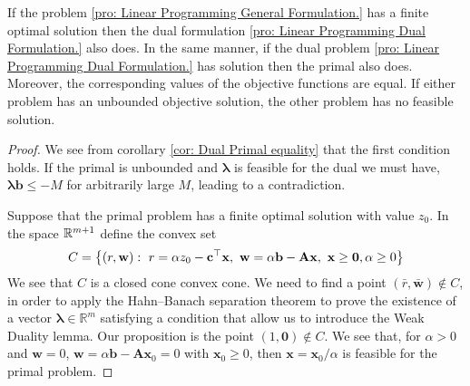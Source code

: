 \begin{theorem}
	If the problem \eqref{pro: Linear Programming General Formulation.} has a finite optimal solution then the dual formulation \eqref{pro: Linear Programming Dual Formulation.} also does. In the same manner, if the dual problem \eqref{pro: Linear Programming Dual Formulation.} has solution then the primal also does. Moreover, the corresponding values of the objective functions are equal. If either problem has an unbounded objective solution, the other problem has no feasible solution.
\end{theorem}
\begin{proof}
We see from corollary \ref{cor: Dual Primal equality} that the first condition holds. If the primal is unbounded and $\pmb{\lambda}$ is feasible for the dual we must have, $\pmb{\lambda}\mathbf{b}\leq -M$ for arbitrarily large $M$, leading to a contradiction. 

Suppose that the primal problem has a finite optimal solution with value $z_0$. In the space $\mathbb{R}^{m+1}$ define the convex set
\begin{equation*}
	C=\left\lbrace \left( r, \mathbf{w} \right):\ r=\alpha z_0-\mathbf{c}^\top\mathbf{x},\ \mathbf{w}=\alpha \mathbf{b}-\mathbf{A}\mathbf{x},\ \mathbf{x}\geq \mathbf{0}, \alpha\geq 0 \right\rbrace
\end{equation*}
We see that $C$ is a closed cone convex cone. We need to find a point $(\bar r, \bar{\mathbf{w}}) \notin C$, in order to apply the Hahn–Banach separation theorem to prove the existence of a vector $\pmb{\lambda}\in\mathbb{R}^m$ satisfying a condition that allow us to introduce the Weak Duality lemma. Our proposition is the point $(1, \mathbf{0}) \notin C$. We see that, for $\alpha>0$ and $\mathbf{w}=0$,  $\mathbf{w}=\alpha\mathbf{b}-\mathbf{A}\mathbf{x}_0=0$ with $\mathbf{x}_0\geq 0$, then $\mathbf{x}=\mathbf{x}_0/\alpha$ is feasible for the primal problem. 


\end{proof}
